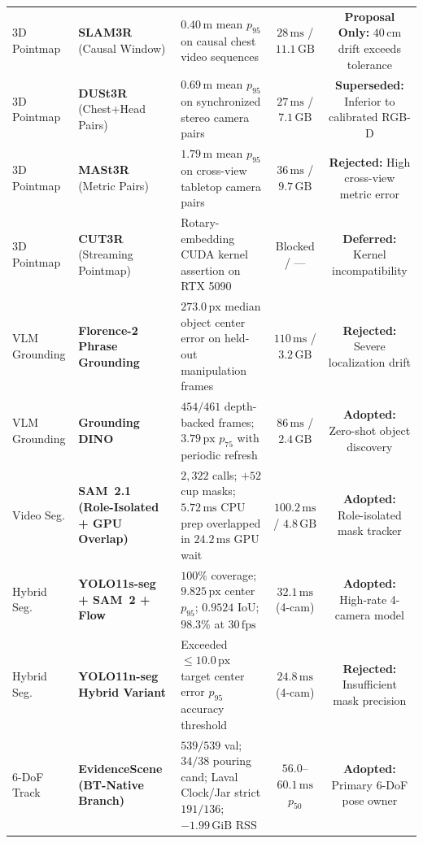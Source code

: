 \documentclass[10pt,journal]{IEEEtran}
\begin{document}
\begin{table}[t]
{\begin{tabular}{@{}llp{6.6cm}cc@{}}
        3D Pointmap & \textbf{SLAM3R} (Causal Window) & $0.40\,\mathrm{m}$ mean $p_{95}$ on causal chest video sequences & $28\,\mathrm{ms}$ / $11.1\,\mathrm{GB}$ & \textbf{Proposal Only:} $40\,\mathrm{cm}$ drift exceeds tolerance \\
        3D Pointmap & \textbf{DUSt3R} (Chest+Head Pairs) & $0.69\,\mathrm{m}$ mean $p_{95}$ on synchronized stereo camera pairs & $27\,\mathrm{ms}$ / $7.1\,\mathrm{GB}$ & \textbf{Superseded:} Inferior to calibrated RGB-D \\
        3D Pointmap & \textbf{MASt3R} (Metric Pairs) & $1.79\,\mathrm{m}$ mean $p_{95}$ on cross-view tabletop camera pairs & $36\,\mathrm{ms}$ / $9.7\,\mathrm{GB}$ & \textbf{Rejected:} High cross-view metric error \\
        3D Pointmap & \textbf{CUT3R} (Streaming Pointmap) & Rotary-embedding CUDA kernel assertion on RTX 5090 & Blocked / --- & \textbf{Deferred:} Kernel incompatibility \\
        VLM Grounding & \textbf{Florence-2 Phrase Grounding} & $273.0\,\mathrm{px}$ median object center error on held-out manipulation frames & $110\,\mathrm{ms}$ / $3.2\,\mathrm{GB}$ & \textbf{Rejected:} Severe localization drift \\
        VLM Grounding & \textbf{Grounding DINO} & $454/461$ depth-backed frames; $3.79\,\mathrm{px}$ $p_{75}$ with periodic refresh & $86\,\mathrm{ms}$ / $2.4\,\mathrm{GB}$ & \textbf{Adopted:} Zero-shot object discovery \\
        Video Seg. & \textbf{SAM~2.1 (Role-Isolated + GPU Overlap)}~\cite{ravi2024sam2} & $2{,}322$ calls; $+52$ cup masks; $5.72\,\mathrm{ms}$ CPU prep overlapped in $24.2\,\mathrm{ms}$ GPU wait & $100.2\,\mathrm{ms}$ / $4.8\,\mathrm{GB}$ & \textbf{Adopted:} Role-isolated mask tracker \\
        Hybrid Seg. & \textbf{YOLO11s-seg + SAM~2 + Flow} & $100\%$ coverage; $9.825\,\mathrm{px}$ center $p_{95}$; $0.9524$ IoU; $98.3\%$ at $30\,\mathrm{fps}$ & $32.1\,\mathrm{ms}$ (4-cam) & \textbf{Adopted:} High-rate 4-camera model \\
        Hybrid Seg. & \textbf{YOLO11n-seg Hybrid Variant} & Exceeded $\le 10.0\,\mathrm{px}$ target center error $p_{95}$ accuracy threshold & $24.8\,\mathrm{ms}$ (4-cam) & \textbf{Rejected:} Insufficient mask precision \\
        6-DoF Track & \textbf{EvidenceScene (BT-Native Branch)}~\cite{bundletrack} & $539/539$ val; $34/38$ pouring cand; Laval Clock/Jar strict $191/136$; $-1.99\,\mathrm{GiB}$ RSS & $56.0$--$60.1\,\mathrm{ms}$ $p_{50}$ & \textbf{Adopted:} Primary 6-DoF pose owner \\

\end{tabular}}
\end{table}
\end{document}
